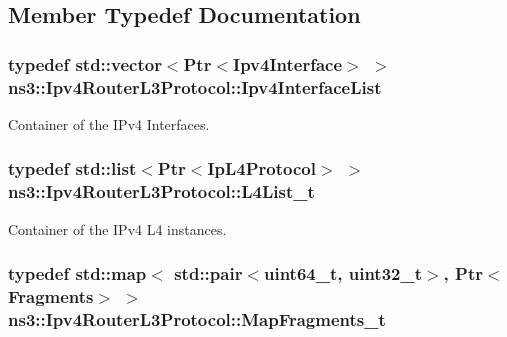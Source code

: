 \subsection{Member Typedef Documentation}
\hypertarget{classns3_1_1Ipv4RouterL3Protocol_a5756b4cefb3bc08242fcc25ce0694adb}{
\subsubsection[{Ipv4\-Interface\-List}]{\setlength{\rightskip}{0pt plus 5cm}typedef std\-::vector$<$Ptr$<$Ipv4\-Interface$>$ $>$ {\bf ns3\-::\-Ipv4\-Router\-L3\-Protocol\-::\-Ipv4\-Interface\-List}\hspace{0.3cm}{\ttfamily [private]}}}\label{classns3_1_1Ipv4RouterL3Protocol_a5756b4cefb3bc08242fcc25ce0694adb}


Container of the I\-Pv4 Interfaces. 

\hypertarget{classns3_1_1Ipv4RouterL3Protocol_adec096bbe99d3a07e5007ce510a9ca20}{
\subsubsection[{L4\-List\-\_\-t}]{\setlength{\rightskip}{0pt plus 5cm}typedef std\-::list$<$Ptr$<$Ip\-L4\-Protocol$>$ $>$ {\bf ns3\-::\-Ipv4\-Router\-L3\-Protocol\-::\-L4\-List\-\_\-t}\hspace{0.3cm}{\ttfamily [private]}}}\label{classns3_1_1Ipv4RouterL3Protocol_adec096bbe99d3a07e5007ce510a9ca20}


Container of the I\-Pv4 L4 instances. 

\hypertarget{classns3_1_1Ipv4RouterL3Protocol_ad13f1d7a6fde1bccea2a986f095bbf9e}{
\subsubsection[{Map\-Fragments\-\_\-t}]{\setlength{\rightskip}{0pt plus 5cm}typedef std\-::map$<$ std\-::pair$<$uint64\-\_\-t, uint32\-\_\-t$>$, Ptr$<${\bf Fragments}$>$ $>$ {\bf ns3\-::\-Ipv4\-Router\-L3\-Protocol\-::\-Map\-Fragments\-\_\-t}\hspace{0.3cm}{\ttfamily [private]}}}\label{classns3_1_1Ipv4RouterL3Protocol_ad13f1d7a6fde1bccea2a986f095bbf9e}


